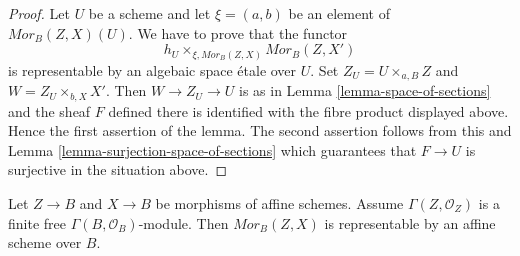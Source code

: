 \begin{proof}
Let $U$ be a scheme and let $\xi = (a, b)$ be an element of
$\mathit{Mor}_B(Z, X)(U)$. We have to prove that the functor
$$
h_U \times_{\xi, \mathit{Mor}_B(Z, X)} \mathit{Mor}_B(Z, X')
$$
is representable by an algebaic space \'etale over $U$. Set
$Z_U = U \times_{a, B} Z$ and $W = Z_U \times_{b, X} X'$.
Then $W \to Z_U \to U$ is as in
Lemma \ref{lemma-space-of-sections}
and the sheaf $F$ defined there is identified with the fibre product
displayed above. Hence the first assertion of the lemma.
The second assertion follows from this and
Lemma \ref{lemma-surjection-space-of-sections}
which guarantees that $F \to U$ is surjective in the situation above.
\end{proof}

\begin{lemma}
\label{lemma-hom-from-finite-free-into-affine}
Let $Z \to B$ and $X \to B$ be morphisms of affine schemes.
Assume $\Gamma(Z, \mathcal{O}_Z)$ is a finite free
$\Gamma(B, \mathcal{O}_B)$-module. Then $\mathit{Mor}_B(Z, X)$
is representable by an affine scheme over $B$.
\end{lemma}

